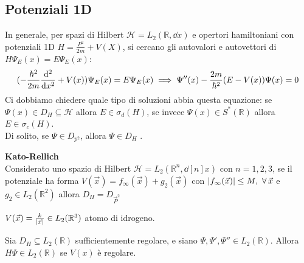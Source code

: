 \subsection{Potenziali 1D}
In generale, per spazi di Hilbert \(\mathcal{H}= L_2(\mathbb{R}, \dd{x})\) e opertori hamiltoniani con potenziali 1D \(H = \frac{P^2}{2m}+ V(X)\), si cercano gli autovalori e autovettori di \(H\Psi_E(x)= E\Psi_E(x)\):
\[
    ( - \frac{\hbar^2}{2m} \dv[2]{}{x} + V(x))\Psi_E(x) = E\Psi_E(x)\implies \Psi''(x) - \frac{2m}{\hbar^2}(E - V(x))\Psi(x)=0
\]
Ci dobbiamo chiedere quale tipo di soluzioni abbia questa equazione: se \(\Psi(x)\in D_H\subseteq \mathcal{H}\) allora \(E \in \sigma_d(H)\), se invece \(\Psi(x) \in S^*(\mathbb{R})\) allora \(E \in \sigma_c(H)\).\\
Di solito, se \(\Psi \in D_{p^2}\), allora \(\Psi \in D_H\) .

\begin{theorem}
    \label{theo: Kato-Rellich}
    {\normalfont\textbf{Kato-Rellich}}\\
    Considerato uno spazio di Hilbert \(\mathcal{H}= L_2(\mathbb{R}^n , \dd[n]{x})\) con \(n = 1,2,3\), 
    se il potenziale ha forma \(V(\vec{x})= f_{\infty}(\vec{x})+ g_2(\vec{x})\)  con \(\abs{f_\infty(\vec{x})}\leq M , \ \forall\, \vec{x}\)
    e \(g_2 \in L_2(\mathbb{R}^2)\) allora \(D_H = D_{\vec{P}^2}\)
\end{theorem}
\begin{example}
    \(V(\vec{x})= \frac{k}{\abs{\vec{x}}} \in L_2(\mathbb{R}^3)\) atomo di idrogeno. 
\end{example}


Sia \( D_H \subseteq L_2(\mathbb{R}) \) sufficientemente regolare, e siano \(\Psi, \Psi', \Psi'' \in L_2(\mathbb{R})\).  
Allora \(H\Psi \in L_2(\mathbb{R})\) se \(V(x)\) è regolare.

